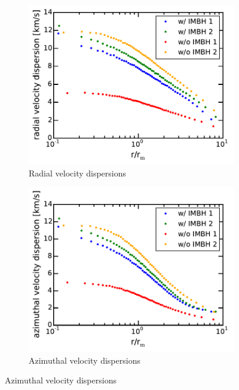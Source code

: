 \begin{figure}[htbp]
	\centering
	\begin{subfigure}{0.475\textwidth}
		\centering
		\includegraphics[width=\textwidth]{Plots/radial_velocity_dispersion.pdf}
		\caption{Radial velocity dispersions}
		\label{fig:radial_vel_disp}
	\end{subfigure}
	\hfill
	\begin{subfigure}{0.475\textwidth}
		\centering
		\includegraphics[width=\textwidth]{Plots/azimuthal_velocity_dispersion.pdf}
		\caption{Azimuthal velocity dispersions}
		\label{fig:azimuthal_vel_disp}
	\end{subfigure}

\end{figure}
